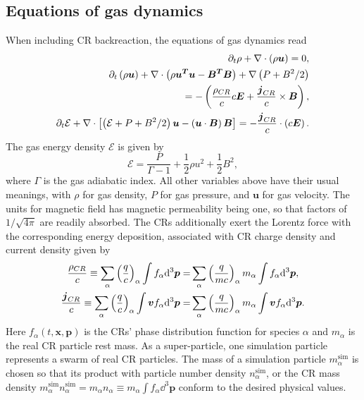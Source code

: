 \documentclass[fleqn,usenatbib]{mnras}
\begin{document}
\subsection{Equations of gas dynamics}
\label{sec::mhd_integrate}
When including CR backreaction, the equations of gas dynamics read \citep{2015ApJ...809...55B}
\begin{align}
	\partial_t \rho + \nabla \cdot \left(\rho \boldsymbol{u}\right) = 0, \label{equ::mhd_mass} \\ 
	\partial_t \left(\rho \boldsymbol{u}\right) + \nabla \cdot \left(\rho \boldsymbol{u^T} \boldsymbol{u} - \boldsymbol{B^T} \boldsymbol{B}\right) + \nabla \left(P + B^2 / 2\right) \notag \\ = -\left(\frac{\rho_{CR}}{c} c\boldsymbol{E} + \frac{\boldsymbol{j}_{CR}}{c} \times \boldsymbol{B} \right), \label{equ::mhd_momentum} \\ 
	\partial_t \mathcal{E} + \nabla \cdot \left[\left(\mathcal{E} + P + B^2 / 2\right) \boldsymbol{u} - \left(\boldsymbol{u} \cdot \boldsymbol{B}\right) \boldsymbol{B} \right] = - \frac{\boldsymbol{j}_{CR}}{c} \cdot \left(c\boldsymbol{E}\right). \label{equ::mhd_energy}
\end{align}
The gas energy density $\mathcal{E}$ is given by
\begin{equation*}
	\mathcal{E} = \frac{P}{\Gamma - 1} + \frac{1}{2} \rho u^2 + \frac{1}{2} B^2,
\end{equation*}
where $\Gamma$ is the gas adiabatic index. All other variables above have their usual meanings,
with $\rho$ for gas density, $P$ for gas pressure, and ${\boldsymbol u}$ for gas velocity.
The units for magnetic field has magnetic permeability being one, so that factors of $1/\sqrt{4\pi}$ are readily absorbed.
The CRs additionally exert the Lorentz force with the corresponding energy deposition, associated with CR charge density and current density given by
\begin{align*}
    \frac{\rho_{CR}}{c} \equiv \sum_{\alpha} \left(\frac{q}{c}\right)_\alpha \int f_\alpha \dd^3 \boldsymbol{p} =& \sum_{\alpha} \left(\frac{q}{mc}\right)_\alpha m_\alpha \int f_\alpha \dd^3 \boldsymbol{p},  \\
	\frac{\boldsymbol{j}_{CR}}{c} \equiv \sum_{\alpha} \left(\frac{q}{c}\right)_\alpha \int \boldsymbol{v} f_\alpha \dd^3 \boldsymbol{p} =& \sum_{\alpha} \left(\frac{q}{mc}\right)_\alpha m_\alpha \int \boldsymbol{v} f_\alpha \dd^3 \boldsymbol{p} \notag .
\end{align*}
Here $f_\alpha\left(t, \boldsymbol{x}, \boldsymbol{p} \right)$ is the CRs' phase distribution function for species $\alpha$ and $m_\alpha$ is the real CR particle rest mass. As a super-particle, one simulation particle represents a swarm of real CR particles.
The mass of a simulation particle $m_\alpha^{\text{sim}}$ is chosen so that its product with particle number density $n_\alpha^{\text{sim}}$, or the CR mass density $m_\alpha^{\text{sim}} n_\alpha^{\text{sim}}=m_\alpha n_\alpha \equiv  m_\alpha \int f_\alpha \dd^3 \boldsymbol{p}$ conform to the desired physical values.
\end{document}
